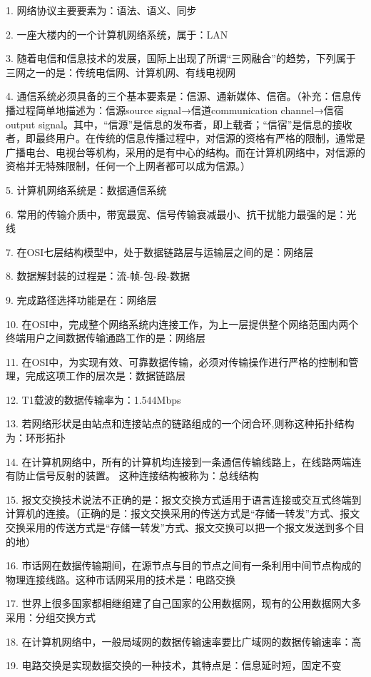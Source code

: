 \documentclass[fleqn]{article}
\begin{document}
1. 网络协议主要要素为：语法、语义、同步

2. 一座大楼内的一个计算机网络系统，属于：LAN

3. 随着电信和信息技术的发展，国际上出现了所谓“三网融合”的趋势，下列属于三网之一的是：传统电信网、计算机网、有线电视网

4. 通信系统必须具备的三个基本要素是：信源、通新媒体、信宿。（补充：信息传播过程简单地描述为：信源source signal→信道communication channel→信宿output signal。其中，“信源”是信息的发布者，即上载者；“信宿”是信息的接收者，即最终用户。在传统的信息传播过程中，对信源的资格有严格的限制，通常是广播电台、电视台等机构，采用的是有中心的结构。而在计算机网络中，对信源的资格并无特殊限制，任何一个上网者都可以成为信源。）

5. 计算机网络系统是：数据通信系统

6. 常用的传输介质中，带宽最宽、信号传输衰减最小、抗干扰能力最强的是：光线

7. 在OSI七层结构模型中，处于数据链路层与运输层之间的是：网络层

8. 数据解封装的过程是：流-帧-包-段-数据 

9. 完成路径选择功能是在：网络层

10. 在OSI中，完成整个网络系统内连接工作，为上一层提供整个网络范围内两个终端用户之间数据传输通路工作的是：网络层

11. 在OSI中，为实现有效、可靠数据传输，必须对传输操作进行严格的控制和管理，完成这项工作的层次是：数据链路层

12. T1载波的数据传输率为：1.544Mbps

13. 若网络形状是由站点和连接站点的链路组成的一个闭合环,则称这种拓扑结构为：环形拓扑

14. 在计算机网络中，所有的计算机均连接到一条通信传输线路上，在线路两端连有防止信号反射的装置。 这种连接结构被称为：总线结构

15. 报文交换技术说法不正确的是：报文交换方式适用于语言连接或交互式终端到计算机的连接。（正确的是：报文交换采用的传送方式是“存储一转发”方式、报文交换采用的传送方式是“存储一转发”方式、报文交换可以把一个报文发送到多个目的地）

16. 市话网在数据传输期间，在源节点与目的节点之间有一条利用中间节点构成的物理连接线路。这种市话网采用的技术是：电路交换

17. 世界上很多国家都相继组建了自己国家的公用数据网，现有的公用数据网大多采用：分组交换方式

18. 在计算机网络中，一般局域网的数据传输速率要比广域网的数据传输速率：高

19. 电路交换是实现数据交换的一种技术，其特点是：信息延时短，固定不变
\end{document}

